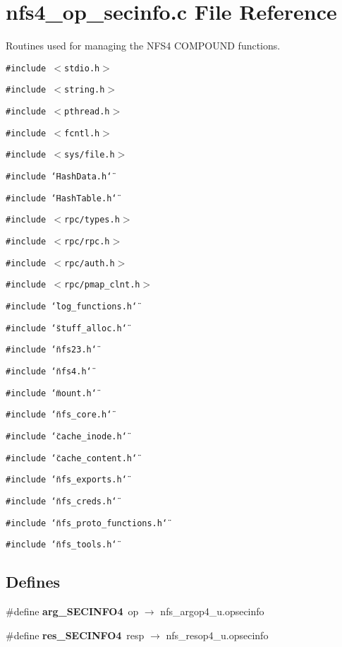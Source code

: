 \section{nfs4\_\-op\_\-secinfo.c File Reference}
\label{nfs4__op__secinfo_8c}
Routines used for managing the NFS4 COMPOUND functions. 

{\tt \#include $<$stdio.h$>$}\par
{\tt \#include $<$string.h$>$}\par
{\tt \#include $<$pthread.h$>$}\par
{\tt \#include $<$fcntl.h$>$}\par
{\tt \#include $<$sys/file.h$>$}\par
{\tt \#include \char`\"{}Hash\-Data.h\char`\"{}}\par
{\tt \#include \char`\"{}Hash\-Table.h\char`\"{}}\par
{\tt \#include $<$rpc/types.h$>$}\par
{\tt \#include $<$rpc/rpc.h$>$}\par
{\tt \#include $<$rpc/auth.h$>$}\par
{\tt \#include $<$rpc/pmap\_\-clnt.h$>$}\par
{\tt \#include \char`\"{}log\_\-functions.h\char`\"{}}\par
{\tt \#include \char`\"{}stuff\_\-alloc.h\char`\"{}}\par
{\tt \#include \char`\"{}nfs23.h\char`\"{}}\par
{\tt \#include \char`\"{}nfs4.h\char`\"{}}\par
{\tt \#include \char`\"{}mount.h\char`\"{}}\par
{\tt \#include \char`\"{}nfs\_\-core.h\char`\"{}}\par
{\tt \#include \char`\"{}cache\_\-inode.h\char`\"{}}\par
{\tt \#include \char`\"{}cache\_\-content.h\char`\"{}}\par
{\tt \#include \char`\"{}nfs\_\-exports.h\char`\"{}}\par
{\tt \#include \char`\"{}nfs\_\-creds.h\char`\"{}}\par
{\tt \#include \char`\"{}nfs\_\-proto\_\-functions.h\char`\"{}}\par
{\tt \#include \char`\"{}nfs\_\-tools.h\char`\"{}}\par
\subsection*{Defines}
\begin{CompactItemize}
\item 
\#define {\bf arg\_\-SECINFO4}\ op $\rightarrow$ nfs\_\-argop4\_\-u.opsecinfo
\item 
\#define {\bf res\_\-SECINFO4}\ resp $\rightarrow$ nfs\_\-resop4\_\-u.opsecinfo
\end{CompactItemize}
